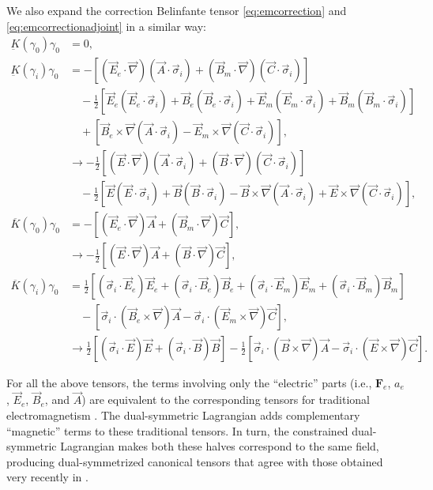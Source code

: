 \documentclass[1p,sort&compress]{elsarticle}
\numberwithin{equation}{section}
\newcommand{\rv}[1]{\vec{#1}}
\newcommand{\bv}[1]{\mathbf{#1}}
\begin{document}
We also expand the correction Belinfante tensor \eqref{eq:emcorrection} and \eqref{eq:emcorrectionadjoint} in a similar way:
\begin{align}
  \label{eq:emcorrectionrel}
  \underbar{K}(\gamma_0)\gamma_0 &= 0, \\
\underbar{K}(\gamma_i)\gamma_0 &= -\left[(\rv{E}_e\cdot\rv{\nabla})(\rv{A}\cdot \rv{\sigma}_i) + (\rv{B}_m\cdot\rv{\nabla})(\rv{C}\cdot \rv{\sigma}_i)\right] \nonumber \\
  &\quad - \frac{1}{2}\left[\rv{E}_e(\rv{E}_e\cdot \rv{\sigma}_i) + \rv{B}_e(\rv{B}_e\cdot \rv{\sigma}_i) + \rv{E}_m(\rv{E}_m\cdot \rv{\sigma}_i) + \rv{B}_m(\rv{B}_m\cdot \rv{\sigma}_i)\right] \nonumber \\
  &\quad + \left[ \rv{B}_e\times\rv{\nabla}(\rv{A}\cdot \rv{\sigma}_i) - \rv{E}_m\times\rv{\nabla}(\rv{C}\cdot \rv{\sigma}_i)\right], \nonumber \\  
  &\to -\frac{1}{2}\left[(\rv{E}\cdot\rv{\nabla})(\rv{A}\cdot \rv{\sigma}_i) + (\rv{B}\cdot\rv{\nabla})(\rv{C}\cdot \rv{\sigma}_i)\right] \nonumber \\
  &\quad - \frac{1}{2}\left[\rv{E}(\rv{E}\cdot \rv{\sigma}_i) + \rv{B}(\rv{B}\cdot \rv{\sigma}_i) - \rv{B}\times\rv{\nabla}(\rv{A}\cdot \rv{\sigma}_i) + \rv{E}\times\rv{\nabla}(\rv{C}\cdot \rv{\sigma}_i)\right], \nonumber
\end{align}
\begin{align}
  \label{eq:emcorrectionadjointrel}
  \overline{K}(\gamma_0)\gamma_0 &= -\left[(\rv{E}_e\cdot\rv{\nabla})\rv{A} + (\rv{B}_m\cdot\rv{\nabla})\rv{C}\right], \\
  &\to -\frac{1}{2}\left[(\rv{E}\cdot\rv{\nabla})\rv{A} + (\rv{B}\cdot\rv{\nabla})\rv{C}\right], \nonumber \\
\overline{K}(\gamma_i)\gamma_0 &= \frac{1}{2}\left[(\rv{\sigma}_i\cdot\rv{E}_e)\rv{E}_e + (\rv{\sigma}_i\cdot\rv{B}_e)\rv{B}_e + (\rv{\sigma}_i\cdot\rv{E}_m)\rv{E}_m + (\rv{\sigma}_i\cdot\rv{B}_m)\rv{B}_m\right] \nonumber \\
&\quad - \left[\rv{\sigma}_i\cdot(\rv{B}_e\times\rv{\nabla})\rv{A} - \rv{\sigma}_i\cdot(\rv{E}_m\times\rv{\nabla})\rv{C}\right], \nonumber \\
&\to \frac{1}{2}\left[(\rv{\sigma}_i\cdot\rv{E})\rv{E} + (\rv{\sigma}_i\cdot\rv{B})\rv{B}\right] - \frac{1}{2}\left[\rv{\sigma}_i\cdot(\rv{B}\times\rv{\nabla})\rv{A} - \rv{\sigma}_i\cdot(\rv{E}\times\rv{\nabla})\rv{C}\right]. \nonumber
\end{align}

For all the above tensors, the terms involving only the ``electric'' parts (i.e., $\bv{F}_e$, $a_e$, $\rv{E}_e$, $\rv{B}_e$, and $\rv{A}$) are equivalent to the corresponding tensors for traditional electromagnetism \cite{Soper1976,Bliokh2013}. The dual-symmetric Lagrangian adds complementary ``magnetic'' terms to these traditional tensors.  In turn, the constrained dual-symmetric Lagrangian makes both these halves correspond to the same field, producing dual-symmetrized canonical tensors that agree with those obtained very recently in \cite{Bliokh2013}. 
\end{document}
